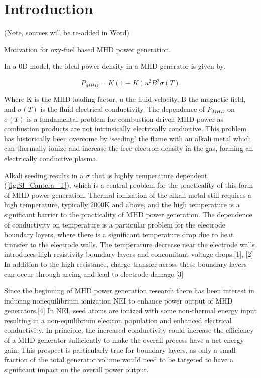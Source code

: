 

\section{Introduction}

(Note, sources will be re-added in Word)

Motivation for oxy-fuel based MHD power generation. 

In a 0D model, the ideal power density in a MHD generator is given by. 

\begin{equation}
P_{MHD} = K(1-K) u^2 B^2 \sigma(T)
\label{eq:mhd_ideal_power}
\end{equation}


Where K is the MHD loading factor, u the fluid velocity, B the magnetic field, and $\sigma(T)$ is the fluid electrical conductivity. The dependence of $P_{MHD}$ on $\sigma(T)$ is a fundamental problem for combustion driven MHD power as combustion products are not intrinsically electrically conductive. This problem has historically been overcome by ‘seeding’ the flame with an alkali metal which can thermally ionize and increase the free electron density in the gas, forming an electrically conductive plasma.  

Alkali seeding results in a $\sigma$ that is highly temperature dependent (\ref{fig:SI_Cantera_T}), which is a central problem for the practicality of this form of MHD power generation. Thermal ionization of the alkali metal still requires a high temperature, typically 2000K and above, and the high temperature is a significant barrier to the practicality of MHD power generation. The dependence of conductivity on temperature is a particular problem for the electrode boundary layers, where there is a significant temperature drop due to heat transfer to the electrode walls. The temperature decrease near the electrode walls introduces high-resistivity boundary layers and concomitant voltage drops.[1], [2] In addition to the high resistance, charge transfer across these boundary layers can occur through arcing and lead to electrode damage.[3] 

Since the beginning of MHD power generation research there has been interest in inducing nonequilibrium ionization NEI to enhance power output of MHD generators.[4] In NEI, seed atoms are ionized with some non-thermal energy input resulting in a non-equilibrium electron population and enhanced electrical conductivity. In principle, the increased conductivity could increase the efficiency of a MHD generator sufficiently to make the overall process have a net energy gain. This prospect is particularly true for boundary layers, as only a small fraction of the total generator volume would need to be targeted to have a significant impact on the overall power output.

